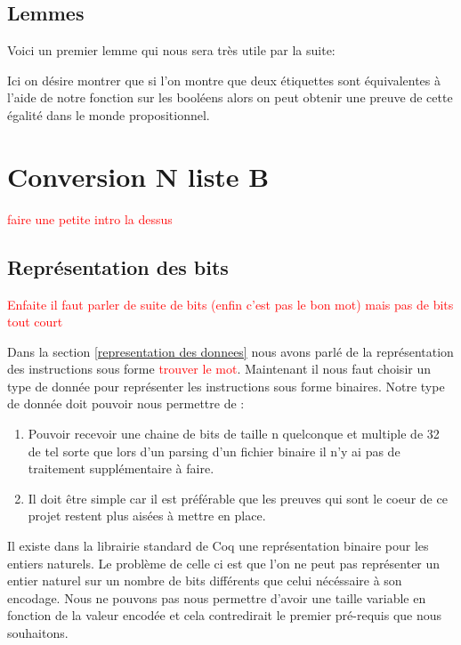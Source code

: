 \documentclass {article}
\newcommand{\codefrom}[3]
           {}
\theoremstyle{definition}
\theoremstyle{remark}
\newcommand{\todo}[1]{\textcolor{red}{#1}}
\begin{document}
\codefrom{rapport}{definitions}{SchemeEqual}



\subsection{Lemmes}
Voici un premier lemme qui nous sera très utile par la suite:
\codefrom{src}{ast_instructions}{tag_beq_different}
Ici on désire montrer que si l'on montre que deux étiquettes sont équivalentes
à l'aide de notre fonction sur les booléens alors on peut obtenir une preuve
de cette égalité dans le monde propositionnel.












\section{Conversion N liste B}

\todo{faire une petite intro la dessus}


\subsection{Représentation des bits}
\todo{Enfaite il faut parler de suite de bits (enfin c'est pas le bon mot) mais pas de bits tout court}

Dans la section \ref{representation des donnees} nous avons parlé de la représentation des instructions
sous forme \todo{trouver le mot}. Maintenant il nous faut choisir un type de donnée pour représenter
les instructions sous forme binaires.
Notre type de donnée doit pouvoir nous permettre de :
\begin{enumerate}
\item Pouvoir recevoir une chaine de bits de taille n quelconque et multiple de 32 de tel sorte que
  lors d'un parsing d'un fichier binaire il n'y ai pas de traitement supplémentaire à faire.
\item Il doit être simple car il est préférable que les preuves qui sont le coeur de ce projet restent
  plus aisées à mettre en place.
\end{enumerate}

Il existe dans la librairie standard de Coq une représentation binaire pour les entiers naturels.
Le problème de celle ci est que l'on ne peut pas représenter un entier naturel sur un nombre de bits différents
que celui nécéssaire à son encodage. Nous ne pouvons pas nous permettre d'avoir une taille variable en
fonction de la valeur encodée et cela contredirait le premier pré-requis que nous souhaitons.
\end{document}
